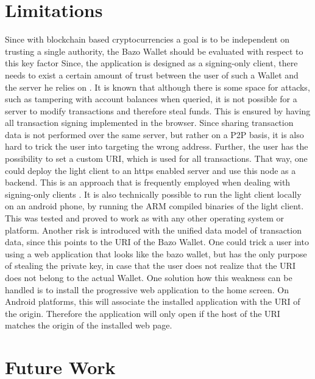 \section{Limitations}
Since with blockchain based cryptocurrencies a goal is to be independent on trusting a single authority, the Bazo Wallet should be evaluated with respect to this key factor
Since, the application is designed as a signing-only client, there needs to exist a certain amount of trust between the user of such a Wallet and the server he relies on \cite{bitcoinclients}.
It is known that although there is some space for attacks, such as tampering with account balances when queried, it is not possible for a server to modify transactions and therefore steal funds. This is ensured by having all transaction signing implemented in the browser. Since sharing transaction data is not performed over the same server, but rather on a P2P basis, it is also hard to trick the user into targeting the wrong address. Further, the user has the possibility to set a custom URI, which is used for all transactions. That way, one could deploy the light client to an https enabled server and use this node as a backend. This is an approach that is frequently employed when dealing with signing-only clients \cite{bitcoinclients}. It is also technically possible to run the light client locally on an android phone, by running the ARM compiled binaries of the light client. This was tested and proved to work as with any other operating system or platform.
Another risk is introduced with the unified data model of transaction data, since this points to the URI of the Bazo Wallet. One could trick a user into using a web application that looks like the bazo wallet, but has the only purpose of stealing the private key, in case that the user does not realize that the URI does not belong to the actual Wallet.
One solution how this weakness can be handled is to install the progressive web application to the home screen. On Android platforms, this will associate the installed application with the URI of the origin. Therefore the application will only open if the host of the URI matches the origin of the installed web page.
\section{Future Work}